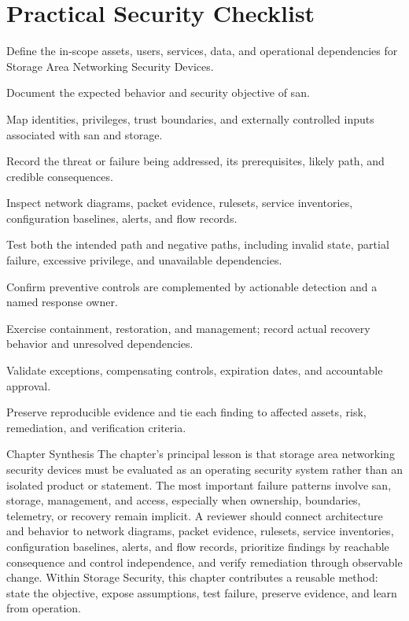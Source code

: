\documentclass[11pt,letterpaper]{article}
\begin{document}
\section*{Practical Security Checklist}
\begin{CornellChecklist}
\item Define the in-scope assets, users, services, data, and operational dependencies for Storage Area Networking Security Devices.
\item Document the expected behavior and security objective of san.
\item Map identities, privileges, trust boundaries, and externally controlled inputs associated with san and storage.
\item Record the threat or failure being addressed, its prerequisites, likely path, and credible consequences.
\item Inspect network diagrams, packet evidence, rulesets, service inventories, configuration baselines, alerts, and flow records.
\item Test both the intended path and negative paths, including invalid state, partial failure, excessive privilege, and unavailable dependencies.
\item Confirm preventive controls are complemented by actionable detection and a named response owner.
\item Exercise containment, restoration, and management; record actual recovery behavior and unresolved dependencies.
\item Validate exceptions, compensating controls, expiration dates, and accountable approval.
\item Preserve reproducible evidence and tie each finding to affected assets, risk, remediation, and verification criteria.
\end{CornellChecklist}
\begin{CornellSummaryBox}{Chapter Synthesis}
The chapter's principal lesson is that storage area networking security devices must be evaluated as an operating security system rather than an isolated product or statement. The most important failure patterns involve san, storage, management, and access, especially when ownership, boundaries, telemetry, or recovery remain implicit. A reviewer should connect architecture and behavior to network diagrams, packet evidence, rulesets, service inventories, configuration baselines, alerts, and flow records, prioritize findings by reachable consequence and control independence, and verify remediation through observable change. Within Storage Security, this chapter contributes a reusable method: state the objective, expose assumptions, test failure, preserve evidence, and learn from operation.
\end{CornellSummaryBox}
\end{document}
